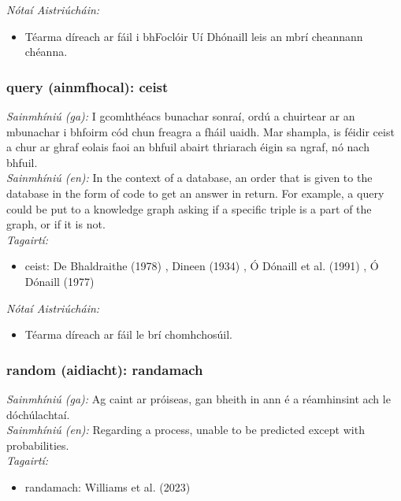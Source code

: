  \noindent \textit{Nótaí Aistriúcháin:}
\begin{itemize}
	\item Téarma díreach ar fáil i bhFoclóir Uí Dhónaill leis an mbrí cheannann chéanna.
\end{itemize}


\subsubsection*{query (ainmfhocal): ceist}
 \noindent \textit{Sainmhíniú (ga):} I gcomhthéacs bunachar sonraí, ordú a chuirtear ar an mbunachar i bhfoirm cód chun freagra a fháil uaidh. Mar shampla, is féidir ceist a chur ar ghraf eolais faoi an bhfuil abairt thriarach éigin sa ngraf, nó nach bhfuil.
\\
 \noindent \textit{Sainmhíniú (en):} In the context of a database, an order that is given to the database in the form of code to get an answer in return. For example, a query could be put to a knowledge graph asking if a specific triple is a part of the graph, or if it is not.
\\
 \noindent \textit{Tagairtí:}
\begin{itemize}
	\item ceist: De Bhaldraithe (1978) \cite{de-bhaldraithe}, Dineen (1934) \cite{dineen}, Ó Dónaill et al. (1991) \cite{focloir-beag}, Ó Dónaill (1977) \cite{odonaill}
\end{itemize}

 \noindent \textit{Nótaí Aistriúcháin:}
\begin{itemize}
	\item Téarma díreach ar fáil le brí chomhchosúil.
\end{itemize}


\subsubsection*{random (aidiacht): randamach}
 \noindent \textit{Sainmhíniú (ga):} Ag caint ar próiseas, gan bheith in ann é a réamhinsint ach le dóchúlachtaí.
\\
 \noindent \textit{Sainmhíniú (en):} Regarding a process, unable to be predicted except with probabilities.
\\
 \noindent \textit{Tagairtí:}
\begin{itemize}
	\item randamach: Williams et al. (2023) \cite{storchiste}
\end{itemize}

